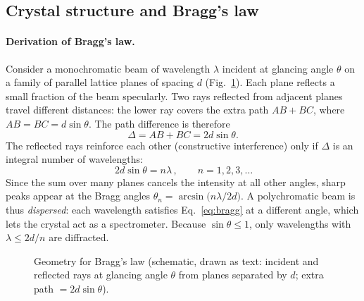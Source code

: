 \documentclass[11pt,a4paper]{article}
\begin{document}
\subsection{Crystal structure and Bragg's law}
\paragraph{Derivation of Bragg's law.}
Consider a monochromatic beam of wavelength $\lambda$ incident at glancing angle $\theta$ on a family of parallel lattice planes of spacing $d$ (Fig.~\ref{fig:bragg}). Each plane reflects a small fraction of the beam specularly. Two rays reflected from adjacent planes travel different distances: the lower ray covers the extra path $AB+BC$, where $AB=BC=d\sin\theta$. The path difference is therefore
\begin{equation}
\Delta = AB+BC = 2d\sin\theta .
\end{equation}
The reflected rays reinforce each other (constructive interference) only if $\Delta$ is an integral number of wavelengths:
\begin{equation}
\boxed{\,2d\sin\theta = n\lambda\,},\qquad n=1,2,3,\dots
\label{eq:bragg}
\end{equation}
Since the sum over many planes cancels the intensity at all other angles, sharp peaks appear at the Bragg angles $\theta_n=\arcsin\!\big(n\lambda/2d\big)$. A polychromatic beam is thus \emph{dispersed}: each wavelength satisfies Eq.~\eqref{eq:bragg} at a different angle, which lets the crystal act as a spectrometer. Because $\sin\theta\le1$, only wavelengths with $\lambda\le 2d/n$ are diffracted.

\begin{figure}[H]
\centering
{}
\caption{Geometry for Bragg's law (schematic, drawn as text: incident and reflected rays at glancing angle $\theta$ from planes separated by $d$; extra path $=2d\sin\theta$).}
\label{fig:bragg}
\end{figure}
\end{document}
